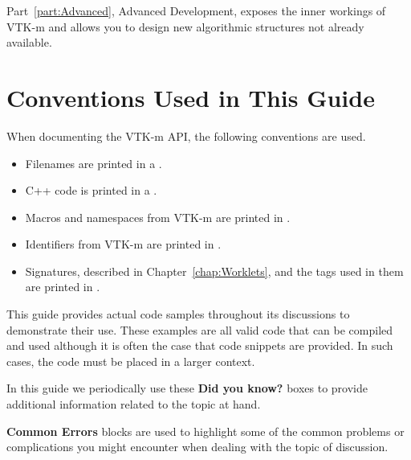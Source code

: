 Part~\ref{part:Advanced}, Advanced Development, exposes the inner workings
of VTK-m and allows you to design new algorithmic structures not already
available. 

\section{Conventions Used in This Guide}

When documenting the VTK-m API, the following conventions are used.
\begin{itemize}
\item Filenames are printed in a .
\item C++ code is printed in a .
\item Macros and namespaces from VTK-m are printed in .
\item Identifiers from VTK-m are printed in .
\item Signatures, described in Chapter~\ref{chap:Worklets}, and the
  tags used in them are printed in .
\end{itemize}

This guide provides actual code samples throughout its discussions to
demonstrate their use. These examples are all valid code that can be
compiled and used although it is often the case that code snippets are
provided. In such cases, the code must be placed in a larger context.

\begin{didyouknow}
  In this guide we periodically use these \textbf{Did you know?} boxes to
  provide additional information related to the topic at hand.
\end{didyouknow}

\begin{commonerrors}
  \textbf{Common Errors} blocks are used to highlight some of the common
  problems or complications you might encounter when dealing with the topic
  of discussion.
\end{commonerrors}
